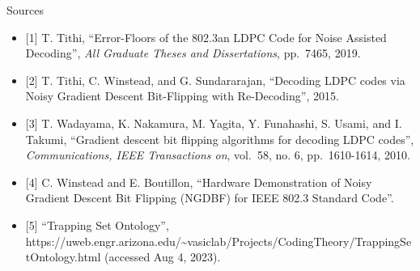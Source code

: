 \documentclass[10pt,ignorenonframetext,]{beamer}
\providecommand{\tightlist}{%
  \setlength{\itemsep}{0pt}\setlength{\parskip}{0pt}}
\begin{document}
\begin{frame}{Sources}
\protect\hypertarget{sources}{}
\begin{itemize}[<+->]
\tightlist
\item
  {[}1{]} T. Tithi, ``Error-Floors of the 802.3an LDPC Code for Noise
  Assisted Decoding'', \emph{All Graduate Theses and Dissertations},
  pp.~7465, 2019.
\item
  {[}2{]} T. Tithi, C. Winstead, and G. Sundararajan, ``Decoding LDPC
  codes via Noisy Gradient Descent Bit-Flipping with Re-Decoding'',
  2015.
\item
  {[}3{]} T. Wadayama, K. Nakamura, M. Yagita, Y. Funahashi, S. Usami,
  and I. Takumi, ``Gradient descent bit flipping algorithms for decoding
  LDPC codes'', \emph{Communications, IEEE Transactions on}, vol.~58,
  no. 6, pp.~1610-1614, 2010.
\item
  {[}4{]} C. Winstead and E. Boutillon, ``Hardware Demonstration of
  Noisy Gradient Descent Bit Flipping (NGDBF) for IEEE 802.3 Standard
  Code''.
\item
  {[}5{]} ``Trapping Set Ontology'',
  https://uweb.engr.arizona.edu/\textasciitilde vasiclab/Projects/CodingTheory/TrappingSetOntology.html
  (accessed Aug 4, 2023).
\end{itemize}
\end{frame}
\end{document}
